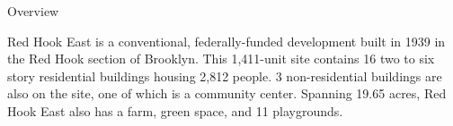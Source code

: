 Overview 

Red Hook East is a conventional, federally-funded development built in 1939 in the Red Hook section of Brooklyn. This 1,411-unit site contains 16 two to six story residential buildings housing 2,812 people. 3 non-residential buildings are also on the site, one of which is a community center. Spanning 19.65 acres, Red Hook East also has a farm, green space, and 11 playgrounds.  